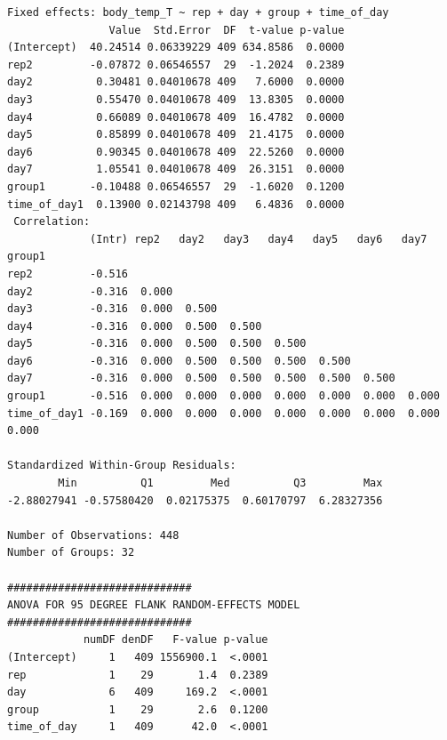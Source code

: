 \documentclass[a4paper, 10pt, titlepage]{article}
\begin{document}
\begin{lstlisting}[basicstyle = \footnotesize \ttfamily]
Fixed effects: body_temp_T ~ rep + day + group + time_of_day 
                Value  Std.Error  DF  t-value p-value
(Intercept)  40.24514 0.06339229 409 634.8586  0.0000
rep2         -0.07872 0.06546557  29  -1.2024  0.2389
day2          0.30481 0.04010678 409   7.6000  0.0000
day3          0.55470 0.04010678 409  13.8305  0.0000
day4          0.66089 0.04010678 409  16.4782  0.0000
day5          0.85899 0.04010678 409  21.4175  0.0000
day6          0.90345 0.04010678 409  22.5260  0.0000
day7          1.05541 0.04010678 409  26.3151  0.0000
group1       -0.10488 0.06546557  29  -1.6020  0.1200
time_of_day1  0.13900 0.02143798 409   6.4836  0.0000
 Correlation: 
             (Intr) rep2   day2   day3   day4   day5   day6   day7   group1
rep2         -0.516                                                        
day2         -0.316  0.000                                                 
day3         -0.316  0.000  0.500                                          
day4         -0.316  0.000  0.500  0.500                                   
day5         -0.316  0.000  0.500  0.500  0.500                            
day6         -0.316  0.000  0.500  0.500  0.500  0.500                     
day7         -0.316  0.000  0.500  0.500  0.500  0.500  0.500              
group1       -0.516  0.000  0.000  0.000  0.000  0.000  0.000  0.000       
time_of_day1 -0.169  0.000  0.000  0.000  0.000  0.000  0.000  0.000  0.000

Standardized Within-Group Residuals:
        Min          Q1         Med          Q3         Max 
-2.88027941 -0.57580420  0.02175375  0.60170797  6.28327356 

Number of Observations: 448
Number of Groups: 32 

############################# 
ANOVA FOR 95 DEGREE FLANK RANDOM-EFFECTS MODEL 
#############################
            numDF denDF   F-value p-value
(Intercept)     1   409 1556900.1  <.0001
rep             1    29       1.4  0.2389
day             6   409     169.2  <.0001
group           1    29       2.6  0.1200
time_of_day     1   409      42.0  <.0001


\end{lstlisting}
\end{document}
